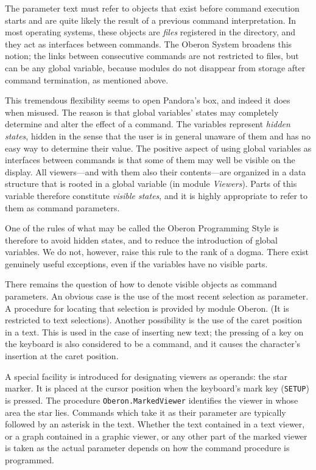 The parameter text must refer to objects that exist before command
execution starts and are quite likely the result of a previous command
interpretation. In most operating systems, these objects are {\it files\/}
registered in the directory, and they act as interfaces between
commands. The Oberon System broadens this notion; the links between
consecutive commands are not restricted to files, but can be any
global variable, because modules do not disappear from storage after
command termination, as mentioned above.

This tremendous flexibility seems to open Pandora's box, and indeed it
does when misused. The reason is that global variables' states may
completely determine and alter the effect of a command. The variables
represent {\it hidden states\/}, hidden in the sense that the user is in
general unaware of them and has no easy way to determine their
value. The positive aspect of using global variables as interfaces
between commands is that some of them may well be visible on the
display. All viewers---and with them also their contents---are
organized in a data structure that is rooted in a global variable (in
module {\it Viewers\/}). Parts of this variable therefore constitute {\it visible states\/},
and it is highly appropriate to refer to them as command
parameters.

One of the rules of what may be called the Oberon Programming Style is
therefore to avoid hidden states, and to reduce the introduction of
global variables. We do not, however, raise this rule to the rank of a
dogma. There exist genuinely useful exceptions, even if the variables
have no visible parts.

There remains the question of how to denote visible objects as command
parameters. An obvious case is the use of the most recent selection as
parameter. A procedure for locating that selection is provided by
module Oberon. (It is restricted to text selections). Another
possibility is the use of the caret position in a text. This is used
in the case of inserting new text; the pressing of a key on the
keyboard is also considered to be a command, and it causes the
character's insertion at the caret position.

A special facility is introduced for designating viewers as operands:
the star marker. It is placed at the cursor position when the
keyboard's mark key ({\tt SETUP}) is pressed. The procedure
{\tt Oberon.MarkedViewer} identifies the viewer in whose area the star
lies. Commands which take it as their parameter are typically followed
by an asterisk in the text. Whether the text contained in a text
viewer, or a graph contained in a graphic viewer, or any other part of
the marked viewer is taken as the actual parameter depends on how the
command procedure is programmed.

